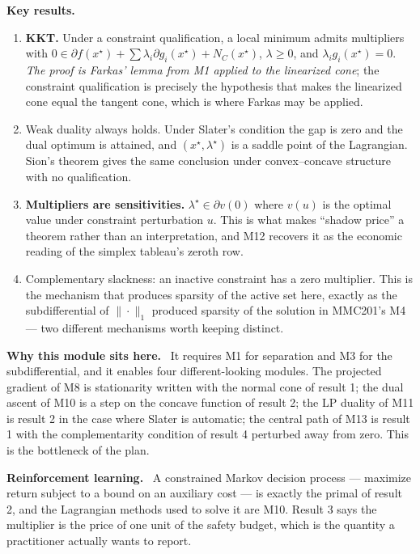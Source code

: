 \documentclass[11pt,a4paper]{article}
\newcommand{\mpart}[1]{\smallskip\noindent\textbf{#1}\ \ignorespaces}
\begin{document}
\mpart{Key results.}
\begin{enumerate}
\item \textbf{KKT.} Under a constraint qualification, a local minimum admits multipliers with
$0 \in \partial f(x^\star) + \sum\lambda_i \partial g_i(x^\star) + N_C(x^\star)$,
$\lambda \ge 0$, and $\lambda_i g_i(x^\star)=0$. \emph{The proof is Farkas' lemma from M1
applied to the linearized cone}; the constraint qualification is precisely the hypothesis
that makes the linearized cone equal the tangent cone, which is where Farkas may be applied.
\item Weak duality always holds. Under Slater's condition the gap is zero and the dual optimum
is attained, and $(x^\star,\lambda^\star)$ is a saddle point of the Lagrangian. Sion's theorem
gives the same conclusion under convex--concave structure with no qualification.
\item \textbf{Multipliers are sensitivities.} $\lambda^\star \in \partial v(0)$ where $v(u)$
is the optimal value under constraint perturbation $u$. This is what makes ``shadow price'' a
theorem rather than an interpretation, and M12 recovers it as the economic reading of the
simplex tableau's zeroth row.
\item Complementary slackness: an inactive constraint has a zero multiplier. This is the
mechanism that produces sparsity of the active set here, exactly as the subdifferential of
$\|\cdot\|_1$ produced sparsity of the solution in MMC201's M4 --- two different mechanisms
worth keeping distinct.
\end{enumerate}

\mpart{Why this module sits here.} It requires M1 for separation and M3 for the
subdifferential, and it enables four different-looking modules. The projected gradient of M8
is stationarity written with the normal cone of result 1; the dual ascent of M10 is a step on
the concave function of result 2; the LP duality of M11 is result 2 in the case where Slater
is automatic; the central path of M13 is result 1 with the complementarity condition of
result 4 perturbed away from zero. This is the bottleneck of the plan.

\mpart{Reinforcement learning.} A constrained Markov decision process --- maximize return
subject to a bound on an auxiliary cost --- is exactly the primal of result 2, and the
Lagrangian methods used to solve it are M10. Result 3 says the multiplier is the price of one
unit of the safety budget, which is the quantity a practitioner actually wants to report.
\end{document}
